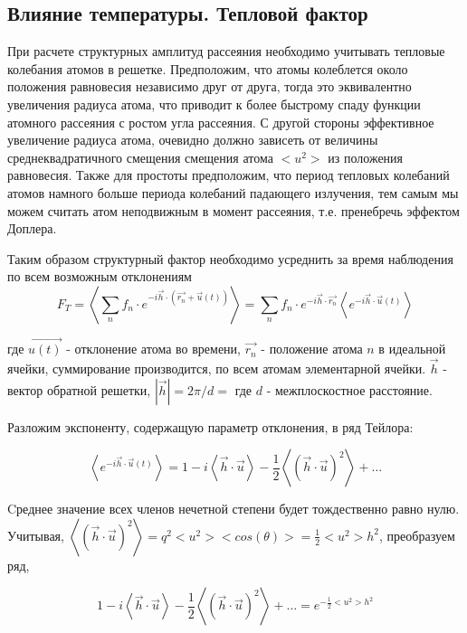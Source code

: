 \subsection{Влияние температуры. Тепловой фактор}

При расчете структурных амплитуд рассеяния необходимо учитывать
тепловые колебания атомов в решетке. Предположим, что атомы колеблется около положения
равновесия независимо друг от друга, тогда это эквивалентно увеличения радиуса атома,
что приводит к более быстрому спаду функции атомного рассеяния с ростом угла рассеяния.
С другой стороны эффективное увеличение радиуса атома, очевидно должно зависеть от
величины среднеквадратичного смещения смещения атома  $<u^2>$ из положения равновесия.
Также для простоты предположим, что период тепловых колебаний атомов намного больше периода
колебаний падающего излучения, тем самым мы можем считать атом неподвижным в момент рассеяния,
т.е. пренебречь эффектом Доплера.

Таким образом структурный фактор необходимо усреднить за время наблюдения по всем возможным отклонениям
\begin{equation}
  F_T = \left\langle \sum_{n} f_n \cdot  e^{-i\vec {h} \cdot (\vec{r_n}+ \vec{u}(t))} \right\rangle =  \sum_{n} f_n \cdot  e^{-i\vec {h} \cdot \vec{r_n}}  \left\langle e^{-i \vec{h} \cdot \vec {u}(t)  } \right\rangle
 \end{equation}

где $\vec{u(t)}$ - отклонение атома во времени, $\vec{r_n}$ - положение атома $n$
в идеальной ячейки, суммирование производится, по всем атомам элементарной ячейки.
$\vec{h}$ - вектор обратной решетки, $|\vec{h}| = 2 \pi / d = $ где $d$ - межплоскостное расстояние.

Разложим экспоненту, содержащую параметр отклонения, в ряд Тейлора:

\begin{equation}
  \left\langle e^{-i \vec{h} \cdot \vec {u}(t)  } \right\rangle = 1 - i  \left\langle \vec{h} \cdot \vec {u} \right\rangle - \frac{1}{2} \left\langle (\vec{h} \cdot \vec {u})^2 \right\rangle+ \ldots
 \end{equation}

 Cреднее значение всех членов нечетной степени будет тождественно равно нулю.
Учитывая,  $ \left\langle (\vec{h} \cdot \vec {u})^2 \right\rangle = q^2 <u^2> <cos(\theta)> = \frac{1}{2}<u^2>h^2$, преобразуем ряд,

\begin{equation}
1 - i  \left\langle \vec{h} \cdot \vec {u} \right\rangle - \frac{1}{2} \left\langle (\vec{h} \cdot \vec {u})^2 \right\rangle+ \ldots = e^{-\frac{1}{2} <u^2> h^2}
 \end{equation}


